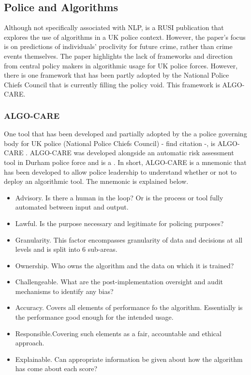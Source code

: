 \subsection{Police and Algorithms}

Although not specifically associated with NLP,  \textcite{babuta2018machine} is a RUSI publication that explores the use of algorithms in a UK police context. However, the paper’s focus is on predictions of individuals’ proclivity for future crime, rather than crime events themselves. The paper highlights the lack of frameworks and direction from central policy makers in algorithmic usage for UK police forces. However, there is one framework that has been partly adopted by the National Police Chiefs Council that is currently filling the policy void. This framework is ALGO-CARE.

\subsubsection{ALGO-CARE}

One tool that has been developed and partially adopted by the a police governing body for UK police (National Police Chiefs Council) - find citation -, is ALGO-CARE  \parencite{oswald2018algorithmic} . ALGO-CARE was developed alongside an automatic risk assessment tool in Durham police force and is a  \parencite{oswald2018algorithmic}. In short, ALGO-CARE is a mnemonic that has been developed to allow police leadership to understand whether or not to deploy an algorithmic tool. The mnemonic is explained below.


\begin{itemize}
\item{Advisory.} Is there a human in the loop? Or is the process or tool fully automated between input and output. 
\item{Lawful.} Is the purpose necessary and legitimate for policing purposes?
\item{Granularity.} This factor encompasses granularity of data and decisions at all levels and is split into 6 sub-areas.
\item{Ownership.} Who owns the algorithm and the data on which it is trained?
\item{Challengeable.} What are the post-implementation oversight and audit mechanisms to identify any bias?
\item{Accuracy.} Covers all elements of performance fo the algorithm. Essentially is the performance good enough for the intended usage.
\item{Responsible.}Covering such elements as a fair, accountable and ethical approach.
\item{Explainable.} Can appropriate information be given about how the algorithm has come about each score?
\end{itemize}

